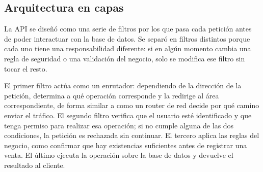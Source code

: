 \subsection{Arquitectura en capas}

La API se diseñó como una serie de filtros por los que pasa cada petición antes de poder interactuar con la base de datos. Se separó en filtros distintos porque cada uno tiene una responsabilidad diferente: si en algún momento cambia una regla de seguridad o una validación del negocio, solo se modifica ese filtro sin tocar el resto.

El primer filtro actúa como un enrutador: dependiendo de la dirección de la petición, determina a qué operación corresponde y la redirige al área correspondiente, de forma similar a como un router de red decide por qué camino enviar el tráfico. El segundo filtro verifica que el usuario esté identificado y que tenga permiso para realizar esa operación; si no cumple alguna de las dos condiciones, la petición es rechazada sin continuar. El tercero aplica las reglas del negocio, como confirmar que hay existencias suficientes antes de registrar una venta. El último ejecuta la operación sobre la base de datos y devuelve el resultado al cliente.

